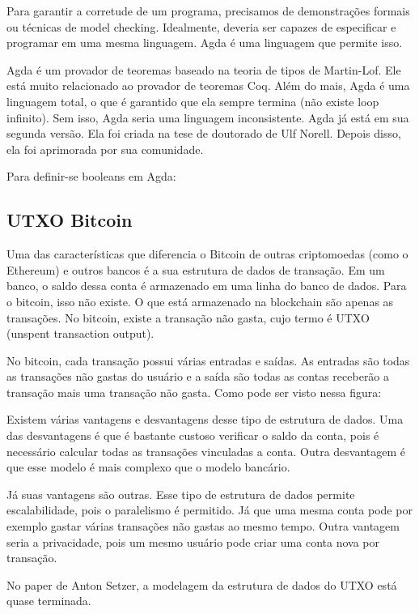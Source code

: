 \documentclass[12pt]{article}
\begin{document}
Para garantir a corretude de um programa, precisamos de demonstrações formais ou técnicas de model checking.
Idealmente, deveria ser capazes de especificar e programar em uma mesma linguagem.
Agda  é uma linguagem que permite isso.

Agda é um provador de teoremas baseado na teoria de tipos de Martin-Lof.
Ele está muito relacionado ao provador de teoremas Coq.
Além do mais, Agda é uma linguagem total, o que é garantido que ela sempre termina (não existe loop infinito).
Sem isso, Agda seria uma linguagem inconsistente.
Agda já está em sua segunda versão.
Ela foi criada na tese de doutorado de Ulf Norell.
Depois disso, ela foi aprimorada por sua comunidade.

Para definir-se booleans em Agda:


\subsection{UTXO Bitcoin}

Uma das características que diferencia o Bitcoin de outras criptomoedas (como o Ethereum) e outros bancos é a sua estrutura de dados de transação. Em um banco, o saldo dessa conta é armazenado em uma linha do banco de dados. Para o bitcoin, isso não existe. O que está armazenado na blockchain são apenas as transações. No bitcoin, existe a transação não gasta, cujo termo é UTXO (unspent transaction output).

No bitcoin, cada transação possui várias entradas e saídas. As entradas são todas as transações não gastas do usuário e a saída são todas as contas receberão a transação mais uma transação não gasta. Como pode ser visto nessa figura:

Existem várias vantagens e desvantagens desse tipo de estrutura de dados. Uma das desvantagens é que é bastante custoso verificar o saldo da conta, pois é necessário calcular todas as transações vinculadas a conta. Outra desvantagem é que esse modelo é mais complexo que o modelo bancário.

Já suas vantagens são outras. Esse tipo de estrutura de dados permite escalabilidade, pois o paralelismo é permitido. Já que uma mesma conta pode por exemplo gastar várias transações não gastas ao mesmo tempo. Outra vantagem seria a privacidade, pois um mesmo usuário pode criar uma conta nova por transação.

No paper de Anton Setzer, a modelagem da estrutura de dados do UTXO está quase terminada.
\end{document}
